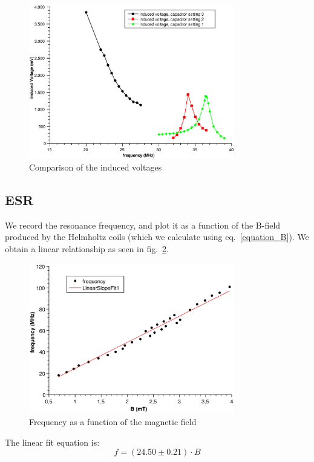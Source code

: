 \documentclass{scrartcl}
\begin{document}
\begin{figure}[!ht]
    \centering
    \includegraphics[width=0.8\textwidth]{voltageComparison.eps}
    \caption{Comparison of the induced voltages}
    \label{fig:inducedVoltageComparison}
\end{figure}
\FloatBarrier

\subsection{ESR}
We record the resonance frequency, and plot it as a function of the B-field produced by the Helmholtz coils (which we calculate using eq.~\ref{equation_B}). We obtain a linear relationship as seen in fig.~\ref{fig:f(B)}.

\begin{figure}[!ht]
    \centering
    \includegraphics[width=0.8\textwidth]{f_B.eps}
    \caption{Frequency as a function of the magnetic field}
    \label{fig:f(B)}
\end{figure}

The linear fit equation is:
\begin{equation*}
    f = (24.50 \pm 0.21) \cdot B
\end{equation*}
\end{document}
